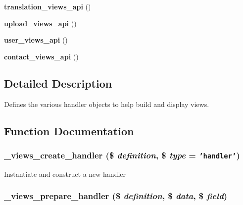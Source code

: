 \begin{CompactItemize}
\item 
\hypertarget{handlers_8inc_5f1ed66b6b802aeb5e2e5a3736d73bbb}{
\textbf{translation\_\-views\_\-api} ()}
\label{handlers_8inc_5f1ed66b6b802aeb5e2e5a3736d73bbb}

\item 
\hypertarget{handlers_8inc_115c1f8e21a974d6b8dbcbe2bf949701}{
\textbf{upload\_\-views\_\-api} ()}
\label{handlers_8inc_115c1f8e21a974d6b8dbcbe2bf949701}

\item 
\hypertarget{handlers_8inc_f1a7351ab05270f14a850a98d34ebc62}{
\textbf{user\_\-views\_\-api} ()}
\label{handlers_8inc_f1a7351ab05270f14a850a98d34ebc62}

\item 
\hypertarget{handlers_8inc_604a17170f1f5f6be0f4678a7b493d3e}{
\textbf{contact\_\-views\_\-api} ()}
\label{handlers_8inc_604a17170f1f5f6be0f4678a7b493d3e}

\end{CompactItemize}


\subsection{Detailed Description}
Defines the various handler objects to help build and display views. 

\subsection{Function Documentation}
\hypertarget{handlers_8inc_77557bf731e44c2951aa8f0c1253b4ae}{
\subsubsection[{\_\-views\_\-create\_\-handler}]{\setlength{\rightskip}{0pt plus 5cm}\_\-views\_\-create\_\-handler (\$ {\em definition}, \/  \$ {\em type} = {\tt 'handler'})}}
\label{handlers_8inc_77557bf731e44c2951aa8f0c1253b4ae}


Instantiate and construct a new handler \hypertarget{handlers_8inc_8e2fd3af54882a8c2b654769a89a612e}{
\subsubsection[{\_\-views\_\-prepare\_\-handler}]{\setlength{\rightskip}{0pt plus 5cm}\_\-views\_\-prepare\_\-handler (\$ {\em definition}, \/  \$ {\em data}, \/  \$ {\em field})}}
\label{handlers_8inc_8e2fd3af54882a8c2b654769a89a612e}


